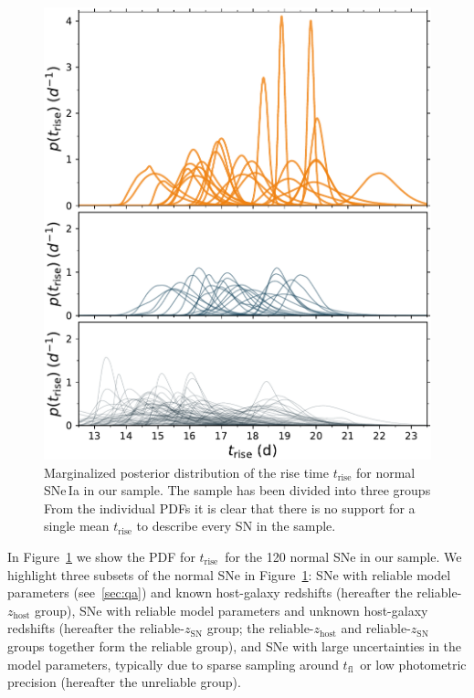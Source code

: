 \documentclass[twocolumn]{./aastex63}
\newcommand{\tfl}{$t_\mathrm{fl}$}
\newcommand{\trise}{$t_\mathrm{rise}$}
\begin{document}
\begin{figure}
    \centering
    \includegraphics[width=1\linewidth]{./figures/rise_time.pdf}
    \caption{Marginalized posterior distribution of the rise time
    $t_\mathrm{rise}$ for normal SNe\,Ia in our sample. The sample has been
    divided into three groups  From the individual PDFs it is clear that there is no
    support for a single mean $t_\mathrm{rise}$ to describe every SN in the
    sample.}
    \label{fig:rise_time}
\end{figure}

In Figure~\ref{fig:rise_time} we show the PDF for \trise\ for the 120 normal
SNe in our sample. We highlight three subsets of the normal SNe in
Figure~\ref{fig:rise_time}: SNe with reliable model parameters
(see~\ref{sec:qa}) and known host-galaxy redshifts (hereafter the
reliable-$z_\mathrm{host}$ group), SNe with reliable model parameters and
unknown host-galaxy redshifts (hereafter the reliable-$z_\mathrm{SN}$ group;
the reliable-$z_\mathrm{host}$ and reliable-$z_\mathrm{SN}$ groups together
form the reliable group), and SNe with large uncertainties in the model
parameters, typically due to sparse sampling around \tfl\ or low photometric
precision (hereafter the unreliable group).
\end{document}
